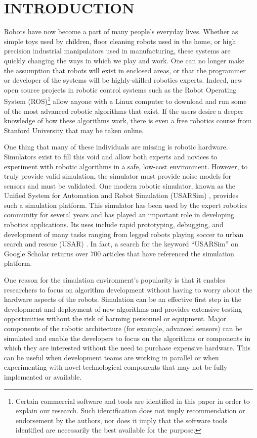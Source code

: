 \section*{INTRODUCTION}
Robots have now become a part of many people's everyday lives. Whether as simple toys used by children, floor cleaning robots used in the home, or high precision industrial manipulators used in manufacturing, these systems are quickly changing the ways in which we play and work. One can no longer make the assumption that robots will exist in enclosed areas, or that the programmer or developer of the systems will be highly-skilled robotics experts. Indeed, new open source projects in robotic control systems such as the Robot Operating System (ROS)\footnote{Certain commercial software and tools are identified in this paper in order to explain our research. Such identification does not imply recommendation or endorsement by the authors, nor does it imply that the software tools identified are necessarily the best available for the purpose.}\cite{ROSWeb} allow anyone with a Linux computer to download and run some of the most advanced robotic algorithms that exist. If the users desire a deeper knowledge of how these algorithms work, there is even a free robotics course from Stanford University that may be taken online.

One thing that many of these individuals are missing is robotic hardware. Simulators exist to fill this void and allow both experts and novices to experiment with robotic algorithms in a safe, low-cost environment. However, to truly provide valid simulation, the simulator must provide noise models for sensors and must be validated. One modern robotic simulator, known as the Unified System for Automation and Robot Simulation (USARSim) \cite{USARSimWeb},  provides such a simulation platform. This simulator has been used by the expert robotics community for several years and has played an important role in developing robotics applications. Its uses include rapid prototyping, debugging, and development of many tasks ranging from legged robots playing soccer \cite{ZARATTI.LNAI.2007} to urban search and rescue (USAR) \cite{CARPIN.LNAI.2006,WANG.WSC.2003}. In fact, a search for the keyword ``USARSim'' on Google Scholar returns over 700 articles that have referenced the simulation platform.

One reason for the simulation environment's popularity is that it enables researchers to focus on algorithm development without having to worry about the hardware aspects of the robots. Simulation can be an effective first step in the development and deployment of new algorithms and provides extensive testing opportunities without the risk of harming personnel or equipment. Major components of the robotic architecture (for example, advanced sensors) can be simulated and enable the developers to focus on the algorithms or components in which they are interested without the need to purchase expensive hardware. This can be useful when development teams are working in parallel or when experimenting with novel technological components that may not be fully implemented or available.

